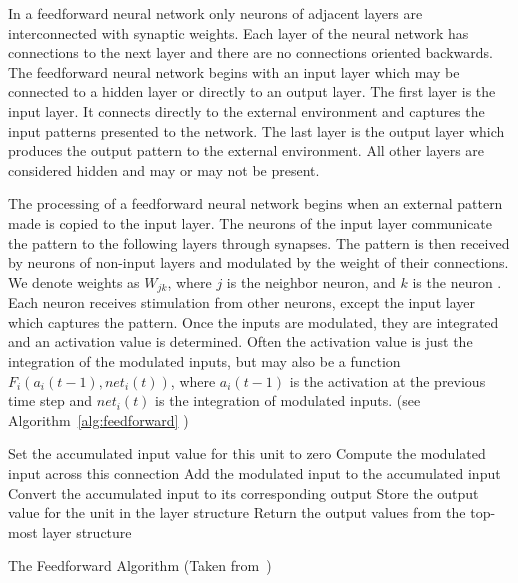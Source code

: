\documentclass[11pt]{article}
\begin{document}
In a feedforward neural network only neurons of adjacent layers are interconnected with synaptic weights. Each layer of the neural
network has connections to the next layer and there are no connections oriented backwards. The feedforward neural network begins with an
input layer which may be connected to a hidden layer or directly to an output layer. The first layer is the input layer. It connects
directly to the external environment and captures the input patterns presented to the network. The last layer is the output layer which
produces the output pattern to the external environment. All other layers are considered hidden and may or may not be present.

The processing of a feedforward neural network begins when an external pattern made is copied to the input layer. The neurons of the
input layer communicate the pattern to the following layers through synapses. The pattern is then received by neurons of non-input
layers and modulated by the weight of their connections. We denote weights as $W_{jk}$, where $j$ is the neighbor neuron, and $k$ is the
neuron . Each neuron receives stimulation from other neurons, except the input layer which captures the pattern. Once the inputs are
modulated, they are integrated and an activation value is determined. Often the activation value is just the integration of the
modulated inputs, but may also be a function $F_{i}(a_{i}(t-1), net_{i}(t))$, where $a_{i}(t-1)$ is the activation at the previous time
step and $net_{i}(t)$ is the integration of modulated inputs. (see Algorithm~\ref{alg:feedforward}
)

\begin{algorithm}%
\SetLine
{}
{
	{
		Set the accumulated input value for this unit to zero\;
			{
				Compute the modulated input across this connection\;
				Add the modulated input to the accumulated input\;
			}
		Convert the accumulated input to its corresponding output\;
		Store the output value for the unit in the layer structure\;
	}
	Return the output values from the top-most layer structure\;
}

\caption{The Feedforward Algorithm (Taken from~\cite{skapura})}
\label{alg:feedforward}
\end{algorithm}

\end{document}
